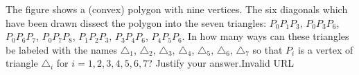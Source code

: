 The figure shows a (convex) polygon with nine vertices. The six diagonals which have been drawn dissect the polygon into the seven triangles: $P_{0}P_{1}P_{3}$,  $P_{0}P_{3}P_{6}$,  $P_{0}P_{6}P_{7}$,  $P_{0}P_{7}P_{8}$,  $P_{1}P_{2}P_{3}$,  $P_{3}P_{4}P_{6}$,  $P_{4}P_{5}P_{6}$. In how many ways can these triangles be labeled with the names $\triangle_{1}$,  $\triangle_{2}$,  $\triangle_{3}$,  $\triangle_{4}$,  $\triangle_{5}$,  $\triangle_{6}$,  $\triangle_{7}$ so that $P_{i}$ is a vertex of triangle $\triangle_{i}$ for $i = 1, 2, 3, 4, 5, 6, 7$? Justify your answer.Invalid URL